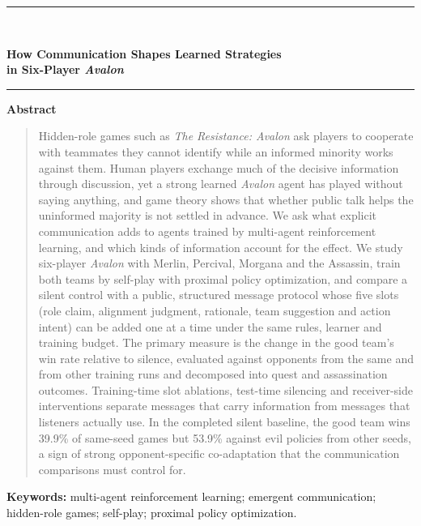 \documentclass[10pt,letterpaper]{article}
\begin{document}
\begin{center}
\rule{\linewidth}{4pt}\\[10pt]
{\LARGE\bfseries How Communication Shapes Learned Strategies\\[3pt] in Six-Player \emph{Avalon}\par}
\vspace{8pt}
\rule{\linewidth}{1pt}
\end{center}
\vspace{4pt}

\begin{center}{\large\bfseries Abstract}\end{center}
\vspace{-4pt}
\begin{quote}
Hidden-role games such as \emph{The Resistance: Avalon} ask players to cooperate with teammates they cannot identify while an informed minority works against them. Human players exchange much of the decisive information through discussion, yet a strong learned \emph{Avalon} agent has played without saying anything, and game theory shows that whether public talk helps the uninformed majority is not settled in advance. We ask what explicit communication adds to agents trained by multi-agent reinforcement learning, and which kinds of information account for the effect. We study six-player \emph{Avalon} with Merlin, Percival, Morgana and the Assassin, train both teams by self-play with proximal policy optimization, and compare a silent control with a public, structured message protocol whose five slots (role claim, alignment judgment, rationale, team suggestion and action intent) can be added one at a time under the same rules, learner and training budget. The primary measure is the change in the good team's win rate relative to silence, evaluated against opponents from the same and from other training runs and decomposed into quest and assassination outcomes. Training-time slot ablations, test-time silencing and receiver-side interventions separate messages that carry information from messages that listeners actually use. In the completed silent baseline, the good team wins 39.9\% of same-seed games but 53.9\% against evil policies from other seeds, a sign of strong opponent-specific co-adaptation that the communication comparisons must control for.
\end{quote}
\vspace{2pt}
\textbf{Keywords:} multi-agent reinforcement learning; emergent communication; hidden-role games; self-play; proximal policy optimization.
\end{document}
